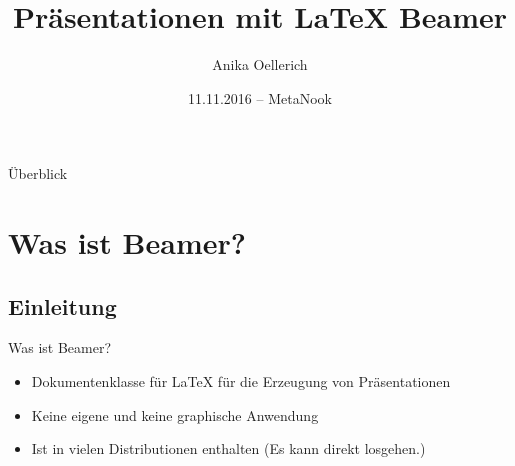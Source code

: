 \documentclass[xcolor=dvipsnames]{beamer}
\title[\LaTeX{} Beamer]{Präsentationen mit \LaTeX{} Beamer}
\author{Anika Oellerich}
\date{11.11.2016 -- MetaNook}
\begin{document}
\frame{\titlepage}
\begin{frame}{Überblick}
\tableofcontents[]
\end{frame}
\section{Was ist Beamer?}
\subsection{Einleitung}
\begin{frame}{Was ist Beamer?}
\begin{itemize}
    \item Dokumentenklasse für \LaTeX{} für die Erzeugung von Präsentationen
    \item Keine eigene und keine graphische Anwendung 
    \item Ist in vielen Distributionen enthalten\newline
      (Es kann direkt losgehen.)
\end{itemize}
\end{frame}
\end{document}
